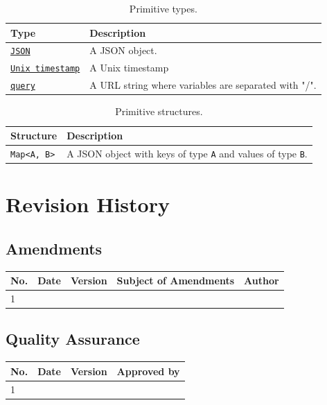 \documentclass[a4paper]{arrowhead}
\newcommand{\pref}[1]{\texttt{\textcolor{RecordBlue}{\hyperref[sec:model:primitive]{#1}}}}
\begin{document}
\begin{table}[h]
\begin{tabularx}{\textwidth}{| p{2.75cm} | X |} \hline
\rowcolor{gray!33} Type & Description \\ \hline

\pref{JSON}              & A JSON object. \\ \hline
\pref{Unix timestamp}    & A Unix timestamp \\ \hline
\pref{query}           & A URL string where variables are separated with "/". \\ \hline

\end{tabularx}
\caption{Primitive types.}
\label{tab:model:primitive-1}
\end{table}

\begin{table}[h]
\begin{tabularx}{\textwidth}{| p{2.75cm} | X |} \hline
\rowcolor{gray!33} Structure & Description \\ \hline

\texttt{Map<A, B>}           & A JSON object with keys of type \texttt{A} and values of type \texttt{B}. \\ \hline

\end{tabularx}
\caption{Primitive structures.}
\label{tab:model:primitive-2}
\end{table}

\newpage

\section{Revision History}
\subsection{Amendments}

\noindent\begin{tabularx}{\textwidth}{| p{1cm} | p{3cm} | p{2cm} | X | p{4cm} |} \hline
\rowcolor{gray!33} No. & Date & Version & Subject of Amendments & Author \\ \hline

1 & & & & \\ \hline

\end{tabularx}

\subsection{Quality Assurance}

\noindent\begin{tabularx}{\textwidth}{| p{1cm} | p{3cm} | p{2cm} | X |} \hline
\rowcolor{gray!33} No. & Date & Version & Approved by \\ \hline

1 & & & \\ \hline

\end{tabularx}
\end{document}
